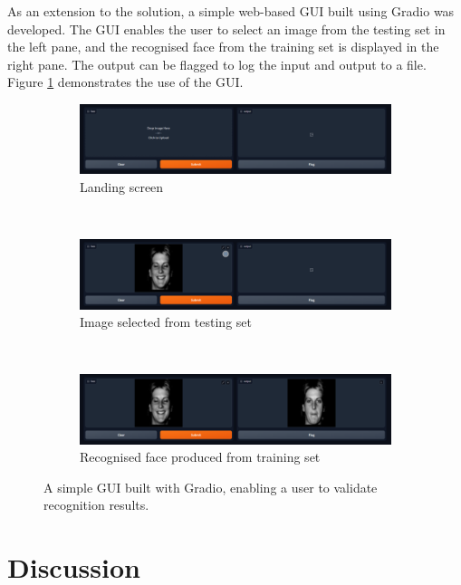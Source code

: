 As an extension to the solution, a simple web-based GUI built using Gradio \cite{gradio_2023} was developed. The GUI enables the user to select an image from the testing set in the left pane, and the recognised face from the training set is displayed in the right pane. The output can be flagged to log the input and output to a file. Figure \ref{fig:gui} demonstrates the use of the GUI.

\begin{figure}[ht]
  \centering
  \begin{subfigure}[b]{0.95\textwidth}
    \centering
    \includegraphics[width=\textwidth]{images/q3_gui_1.png}
    \caption{Landing screen}
  \end{subfigure}
  \\[1em]
  \begin{subfigure}[b]{0.95\textwidth}
    \centering
    \includegraphics[width=\textwidth]{images/q3_gui_2.png}
    \caption{Image selected from testing set}
  \end{subfigure}
  \\[1em]
  \begin{subfigure}[b]{0.95\textwidth}
    \centering
    \includegraphics[width=\textwidth]{images/q3_gui_3.png}
    \caption{Recognised face produced from training set}
  \end{subfigure}
  \caption{A simple GUI built with Gradio, enabling a user to validate recognition results.}
  \label{fig:gui}
\end{figure}

\newpage
\section{Discussion}

